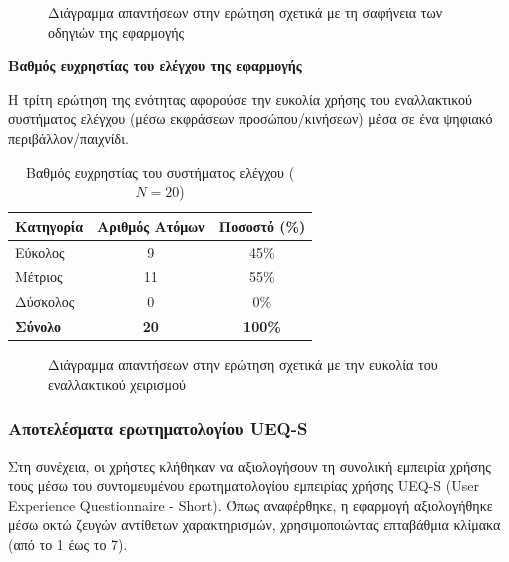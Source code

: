 \documentclass[twoside, a4paper, 11pt]{article}
\newcommand{\textlatin}[1]{\textenglish{#1}}
\begin{document}
\begin{figure}[H]
    \centering
    \caption{Διάγραμμα απαντήσεων στην ερώτηση σχετικά με τη σαφήνεια των οδηγιών της εφαρμογής}
\end{figure}

\vspace{1em}
\noindent\textbf{Βαθμός ευχρηστίας του ελέγχου της εφαρμογής}

Η τρίτη ερώτηση της ενότητας αφορούσε την ευκολία χρήσης του εναλλακτικού συστήματος ελέγχου (μέσω εκφράσεων προσώπου/κινήσεων) μέσα σε ένα ψηφιακό περιβάλλον/παιχνίδι.

\begin{table}[H]
    \centering
    \caption{Βαθμός ευχρηστίας του συστήματος ελέγχου ($N = 20$)}
    \begin{tabular}{|l|c|c|}
        \hline
        \textbf{Κατηγορία} & \textbf{Αριθμός Ατόμων} & \textbf{Ποσοστό (\%)} \\ \hline
        Εύκολος & 9 & 45\% \\ \hline
        Μέτριος & 11 & 55\% \\ \hline
        Δύσκολος & 0 & 0\% \\ \hline
        \textbf{Σύνολο} & \textbf{20} & \textbf{100\%} \\ \hline
    \end{tabular}
\end{table}

\begin{figure}[H]
    \centering
    \caption{Διάγραμμα απαντήσεων στην ερώτηση σχετικά με την ευκολία του εναλλακτικού χειρισμού}
\end{figure}

\subsubsection{Αποτελέσματα ερωτηματολογίου UEQ-S}

Στη συνέχεια, οι χρήστες κλήθηκαν να αξιολογήσουν τη συνολική εμπειρία χρήσης τους μέσω του συντομευμένου ερωτηματολογίου εμπειρίας χρήσης \textlatin{UEQ-S} (\textlatin{User Experience Questionnaire - Short}). Όπως αναφέρθηκε, η εφαρμογή αξιολογήθηκε μέσω οκτώ ζευγών αντίθετων χαρακτηρισμών, χρησιμοποιώντας επταβάθμια κλίμακα (από το 1 έως το 7).
\end{document}
